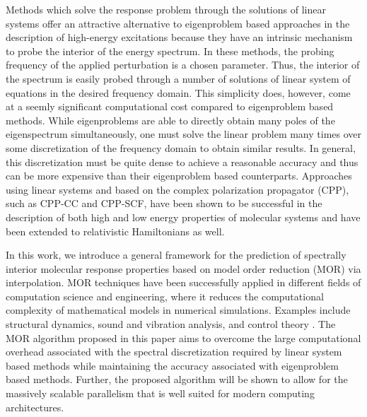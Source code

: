 Methods which solve the response problem through the solutions of linear systems offer an attractive alternative to eigenproblem based approaches in the description of high-energy excitations because they have an intrinsic
mechanism to probe the interior of the energy spectrum. In these methods, the
probing frequency of the applied perturbation is a chosen parameter.\cite{Hattig98_1,Ruud12_543} Thus,
the interior of the spectrum is easily probed through a number of solutions
of linear system of equations in the desired frequency domain. This simplicity 
does, however, come at a seemly significant computational cost compared to eigenproblem based methods.
While eigenproblems are able to directly obtain many poles of the eigenspectrum
simultaneously, one must solve the linear problem many times
over some discretization of the frequency domain to obtain similar results.
In general, this discretization must be quite dense to achieve a reasonable 
accuracy and thus can be more expensive than their eigenproblem based counterparts. Approaches using linear systems and based on the complex
polarization propagator (CPP), such as CPP-CC\cite{Norman12_1616,Norman13_124311,Coriani13_211102} and CPP-SCF,\cite{Rubio_Book,Ruud12_543,Yeager84_33,Oddershede01_JCP}
have been shown to be successful in the description of both high\cite{Norman16_1991,Norman12_022507,Norman10_5096,Agren06_143001,Norman16_13591} and low\cite{Mathieu15_21866} energy properties of molecular systems and have been extended to relativistic Hamiltonians as well\cite{Norman10_064105}.

In this work, we introduce a general framework for the prediction of spectrally interior molecular response properties based on model order reduction (MOR) via interpolation. MOR techniques have been successfully applied in different fields of computation science and engineering, where it reduces the computational complexity of mathematical models in numerical simulations. Examples include structural dynamics, sound and vibration analysis, and control theory \cite{Antoulas2005,Farhat12_IJNME,Farhat13_IJNME}. The MOR algorithm proposed in this paper aims to overcome the large computational overhead associated with the spectral discretization required by linear system based methods while maintaining the accuracy associated with eigenproblem based methods. Further, the proposed algorithm will be shown to allow for the massively scalable parallelism that is well suited for modern computing architectures.

